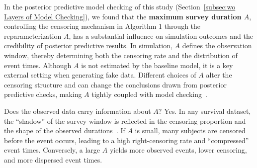 In the posterior predictive model checking of this study (Section~\ref{subsec:wo Layers of Model Checking}), we found that the \textbf{maximum survey duration $A$}, controlling the censoring mechanism in Algorithm 1 through the reparameterization $A$, has a substantial influence on simulation outcomes and the credibility of posterior predictive results. In simulation, $A$ defines the observation window, thereby determining both the censoring rate and the distribution of event times. Although $A$ is not estimated by the baseline model, it is a key external setting when generating fake data. Different choices of $A$ alter the censoring structure and can change the conclusions drawn from posterior predictive checks, making $A$ tightly coupled with model checking~\cite{stats5010006}.

Does the observed data carry information about $A$? Yes. In any survival dataset, the “shadow” of the survey window is reflected in the censoring proportion and the shape of the observed durations~\cite{barrajón2020effectrightcensoringbias, stats5010006, bartovs2022informed}. If $A$ is small, many subjects are censored before the event occurs, leading to a high right-censoring rate and “compressed” event times. Conversely, a large $A$ yields more observed events, lower censoring, and more dispersed event times.

